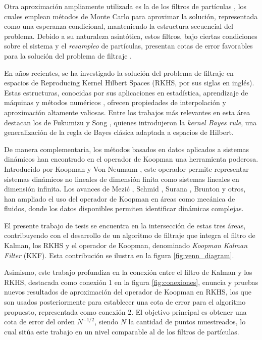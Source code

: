 Otra aproximación ampliamente utilizada es la de los filtros de partículas \cite{Hammersley1954PoorCarlo, Liu1998SequentialSystems}, los cuales emplean métodos de Monte Carlo para aproximar la solución, representada como una esperanza condicional, manteniendo la estructura secuencial del problema. Debido a su naturaleza asintótica, estos filtros, bajo ciertas condiciones sobre el sistema y el \textit{resampleo} de partículas, presentan cotas de error favorables para la solución del problema de filtraje \cite{Crisan2002APractitioners}.

En años recientes, se ha investigado la solución del problema de filtraje en espacios de Reproducing Kernel Hilbert Spaces (RKHS, por sus siglas en inglés). Estas estructuras, conocidas por sus aplicaciones en estadística, aprendizaje de máquinas y métodos numéricos \cite{Wendland2004ScatteredApproximation, Christmann2008SupportMachines}, ofrecen propiedades de interpolación y aproximación altamente valiosas. Entre los trabajos más relevantes en esta área destacan los de Fukumizu y Song \cite{Fukumizu2004DimensionalitySpaces, Song2009HilbertSystems}, quienes introdujeron la \textit{kernel Bayes rule}, una generalización de la regla de Bayes clásica adaptada a espacios de Hilbert.

De manera complementaria, los métodos basados en datos aplicados a sistemas dinámicos han encontrado en el operador de Koopman una herramienta poderosa. Introducido por Koopman y Von Neumann \cite{Koopman1931HamiltonianSpace, Koopman1932DynamicalSpectra}, este operador permite representar sistemas dinámicos no lineales de dimensión finita como sistemas lineales en dimensión infinita. Los avances de Mezić \cite{Mezic2013AnalysisOperator}, Schmid \cite{Schmid2008DynamicData}, Surana \cite{Surana2016KoopmanSystems}, Brunton \cite{Brunton2016KoopmanControl} y otros, han ampliado el uso del operador de Koopman en áreas como mecánica de fluidos, donde los datos disponibles permiten identificar dinámicas complejas.

El presente trabajo de tesis se encuentra en la intersección de estas tres áreas, contribuyendo con el desarrollo de un algoritmo de filtraje que integra el filtro de Kalman, los RKHS y el operador de Koopman, denominado \textit{Koopman Kalman Filter} (KKF). Esta contribución se ilustra en la figura \ref{fig:venn_diagram}.

Asimismo, este trabajo profundiza en la conexión entre el filtro de Kalman y los RKHS, destacada como conexión 1 en la figura \ref{fig:conexiones}, enuncia y pruebas nuevos resultados de aproximación del operador de Koopman en RKHS, los que son usados posteriormente para establecer una cota de error para el algoritmo propuesto, representada como conexión 2. El objetivo principal es obtener una cota de error del orden $N^{-1/2}$, siendo $N$ la cantidad de puntos muestreados, lo cual sitúa este trabajo en un nivel comparable al de los filtros de partículas.

